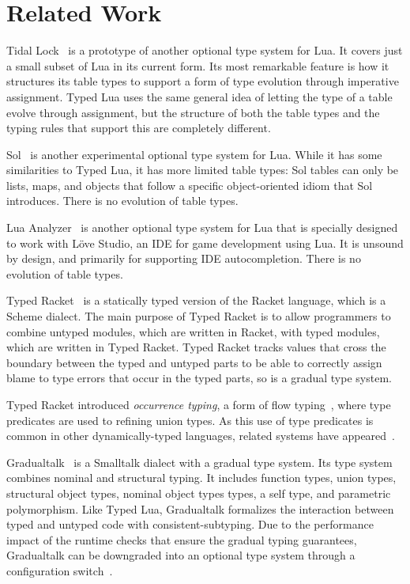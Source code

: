 \documentclass[10pt]{sigplanconf}
\begin{document}
\section{Related Work}
\label{sec:related}

Tidal Lock~\cite{tidallock} is a prototype of another optional type system for Lua. It covers just a small subset of Lua
in its current form. Its most remarkable feature is
how it structures its table types to support a form of type
evolution through imperative assignment. Typed Lua uses
the same general idea of letting the type of a table evolve
through assignment, but the structure of both the table types
and the typing rules that support this are completely different.

Sol~\cite{sol} is another experimental optional type system
for Lua. While it has some similarities to Typed Lua, it
has more limited table types: Sol tables can only be lists,
maps, and objects that follow a specific object-oriented
idiom that Sol introduces. There is no evolution of table
types.

Lua Analyzer~\cite{luaanalyzer} is another optional type
system for Lua that is specially designed to work with
Löve Studio, an IDE for game development using Lua.
It is unsound by design, and primarily for supporting
IDE autocompletion. There is no evolution of table types.

Typed Racket~\cite{tobin-hochstadt2008ts} is a statically typed version of the Racket language, which is a Scheme dialect.
The main purpose of Typed Racket is to allow programmers to combine untyped modules, which are written in Racket, with typed modules, which are written in Typed Racket. Typed Racket tracks
values that cross the boundary between the typed and
untyped parts to be able to correctly assign blame to type
errors that occur in the typed parts, so is a gradual type
system.

Typed Racket introduced {\em occurrence typing}, a form of
flow typing~\cite{tobin-hochstadt2010ltu}, where type
predicates are used to refining union types.
As this use of type predicates is common in other
dynamically-typed languages, related systems
have appeared~\cite{guha2011tlc,winther2011gtp,pearce2013ccf}.

Gradualtalk~\cite{allende2013gts} is a Smalltalk dialect 
with a gradual type system. Its type system combines
nominal and structural typing.
It includes function types, union types, structural object types,
nominal object types types, a self type, and parametric polymorphism. Like Typed Lua, Gradualtalk formalizes the
interaction between typed and untyped code with consistent-subtyping. Due to the performance impact of
the runtime checks that ensure the gradual typing guarantees,
Gradualtalk can be downgraded into an optional type system
through a configuration switch~\cite{allende2013cis}.
\end{document}
